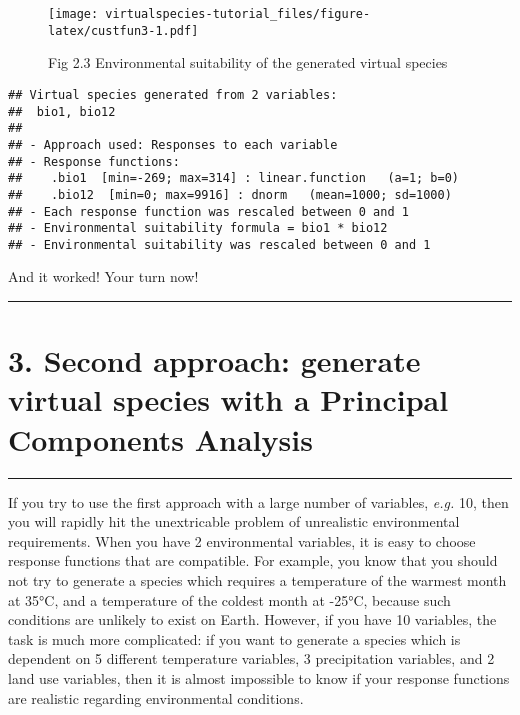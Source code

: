 \documentclass[]{article}
\begin{document}
\begin{figure}
\centering
\texttt{[image: virtualspecies-tutorial\_files/figure-latex/custfun3-1.pdf]}
\caption{Fig 2.3 Environmental suitability of the generated virtual
species}
\end{figure}

\begin{verbatim}
## Virtual species generated from 2 variables:
##  bio1, bio12
## 
## - Approach used: Responses to each variable
## - Response functions:
##    .bio1  [min=-269; max=314] : linear.function   (a=1; b=0)
##    .bio12  [min=0; max=9916] : dnorm   (mean=1000; sd=1000)
## - Each response function was rescaled between 0 and 1
## - Environmental suitability formula = bio1 * bio12
## - Environmental suitability was rescaled between 0 and 1
\end{verbatim}

And it worked! Your turn now!

\begin{center}\rule{0.5\linewidth}{\linethickness}\end{center}

\hypertarget{second-approach-generate-virtual-species-with-a-principal-components-analysis}{\section{3.
Second approach: generate virtual species with a Principal Components
Analysis}\label{second-approach-generate-virtual-species-with-a-principal-components-analysis}}

\begin{center}\rule{0.5\linewidth}{\linethickness}\end{center}

\setcounter{section}{3} \setcounter{figure}{0}

If you try to use the first approach with a large number of variables,
\emph{e.g.} 10, then you will rapidly hit the unextricable problem of
unrealistic environmental requirements. When you have 2 environmental
variables, it is easy to choose response functions that are compatible.
For example, you know that you should not try to generate a species
which requires a temperature of the warmest month at 35°C, and a
temperature of the coldest month at -25°C, because such conditions are
unlikely to exist on Earth. However, if you have 10 variables, the task
is much more complicated: if you want to generate a species which is
dependent on 5 different temperature variables, 3 precipitation
variables, and 2 land use variables, then it is almost impossible to
know if your response functions are realistic regarding environmental
conditions.
\end{document}
